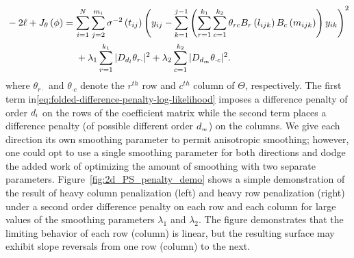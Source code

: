 \begin{align} 
\begin{split}\label{eq:folded-difference-penalty-log-likelihood}
&-2\ell + J_\theta \left(\phi\right) = \sum_{i=1}^N \sum_{j=2}^{m_i} \sigma^{-2}\left({t_{ij}}\right) \left(y_{ij} - \sum_{k=1}^{j-1} \left( \sum_{r=1}^{k_1} \sum_{c=1}^{k_2} \theta_{rc} B_r\left(l_{ijk}\right)B_c\left(m_{ijk}\right)\right)y_{ik} \right)^2 \\ 
&\phantom{{}-2\ell + J_\theta \left(\phi\right) = {}} + \lambda_1 \sum_{r=1}^{k_1} \vert D_{d_{\ms l}} \theta_{r \cdot} \vert^2 + \lambda_2 \sum_{c=1}^{k_2} \vert D_{d_{\ms m}} \theta_{\cdot c} \vert^2.
\end{split}
\end{align}
\noindent
where $\theta_{r \cdot}$ and $\theta_{\cdot c}$ denote the $r^{th}$ row and $c^{th}$ column of $\Theta$, respectively. The first term in\ref{eq:folded-difference-penalty-log-likelihood} imposes a difference penalty of order $d_{\scriptscriptstyle l}$ on the rows of the coefficient matrix while the second term places a difference penalty (of possible different order $d_{\scriptscriptstyle m}$) on the columns. We give each direction its own smoothing parameter to permit anisotropic smoothing; however, one could opt to use a single smoothing parameter for both directions and dodge the added work of optimizing the amount of smoothing with two separate parameters. Figure~\ref{fig:2d_PS_penalty_demo} shows a simple demonstration of the result of heavy column penalization (left) and heavy row penalization (right) under a second order difference penalty on each row and each column for large values of the smoothing parameters $\lambda_1$ and $\lambda_2$. The figure demonstrates that the limiting behavior of each row (column) is linear, but the resulting surface may exhibit slope reversals from one row (column) to the next. 

